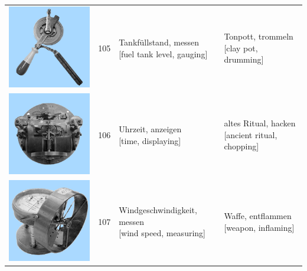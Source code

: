 \documentclass[
  english,
  man,floatsintext]{apa7}
\begin{document}
\begin{center}
\begin{ThreePartTable}
{\begin{longtable}{llll}
\includegraphics[valign=c, scale=0.23]{../materials/unfamiliar/105.png} & 105 & \makecell[l]{Tankfüllstand, messen\\{[fuel tank level, gauging]}} & \makecell[l]{Tonpott, trommeln\\{[clay pot, drumming]}}\\
\includegraphics[valign=c, scale=0.23]{../materials/unfamiliar/106.png} & 106 & \makecell[l]{Uhrzeit, anzeigen\\{[time, displaying]}} & \makecell[l]{altes Ritual, hacken\\{[ancient ritual, chopping]}}\\
\includegraphics[valign=c, scale=0.23]{../materials/unfamiliar/107.png} & 107 & \makecell[l]{Windgeschwindigkeit, messen\\{[wind speed, measuring]}} & \makecell[l]{Waffe, entflammen\\{[weapon, inflaming]}}\\

\end{longtable}}
\end{ThreePartTable}
\end{center}
\end{document}
